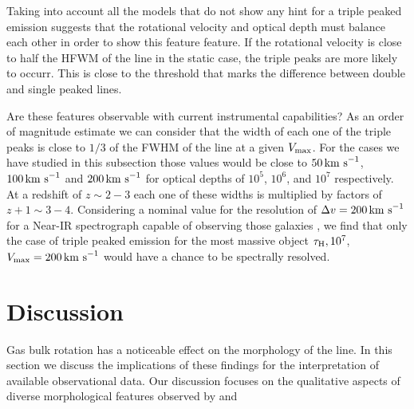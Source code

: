 \documentclass{emulateapj}
\newcommand{\ly}{{\ifmmode{{\rm Ly}\alpha~}\else{Ly$\alpha$~}\fi}}
\newcommand{\kms}{{\ifmmode{{\mathrm{\,km\ s}^{-1}}}\else{\,km~s$^{-1}$}\fi}}
\begin{document}
Taking into account all the models that do not show any hint for
a triple peaked emission suggests that the rotational velocity
and optical depth must balance each other in order to show this feature
feature. If the rotational velocity is close to half the HFWM
of the line in the static case, the triple peaks are more likely to
occurr. This is close to the threshold that marks the difference
between double and single peaked lines. 

Are these features observable with current instrumental capabilities?
As an order of magnitude estimate we can consider that the width of
each one of the triple peaks is close to $1/3$ of the FWHM of the line
at a given $V_{\rm max}$. For the cases we have studied in this
subsection those values would be close to $50\kms$, $100\kms$ and
$200\kms$ for optical depths of $10^5$, $10^6$, and $10^7$
respectively. At a redshift of $z\sim 2-3$ each one of these widths
is multiplied by factors of $z+1\sim 3-4$. Considering a nominal value
for the resolution of $\Delta v=200\kms$ for a Near-IR spectrograph
capable of observing those galaxies \citep{Kulas12}, we find that only
the case of triple peaked emission for the most massive object
$\tau_{\rm H}, 10^{7}$, $V_{\rm max}=200\kms$ would have a chance to
be spectrally resolved.  





\section{Discussion}
\label{sec:discussion}

Gas bulk rotation has a noticeable effect on the morphology of the
 \ly line. In this section we discuss the implications of these
 findings for the interpretation of available observational data. Our
 discussion focuses on the qualitative aspects of diverse
 morphological features observed by \cite{Kulas12} and \cite{Yamada2012}
\end{document}
